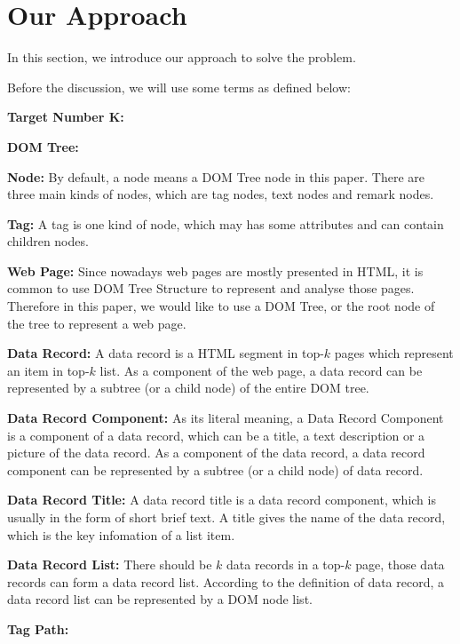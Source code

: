 \section{Our Approach}
\label{sec:algo}
In this section, we introduce our approach to solve the problem.

Before the discussion, we will use some terms as defined below:

{\bf Target Number K:}

{\bf DOM Tree:} 	

{\bf Node:}		
By default, a node means a DOM Tree node in this paper.
There are three main kinds of nodes, which are tag nodes, text nodes and remark nodes.

{\bf Tag:}		
A tag is one kind of node, which may has some attributes and can contain children nodes.

{\bf Web Page:}
Since nowadays web pages are mostly presented in HTML, it is common to use DOM Tree Structure to represent and analyse those pages.
Therefore in this paper, we would like to use a DOM Tree, or the root node of the tree to represent a web page.

{\bf Data Record:}
A data record is a HTML segment in top-$k$ pages which represent an item in top-$k$ list.
As a component of the web page, a data record can be represented by a subtree (or a child node) of the entire DOM tree.

{\bf Data Record Component:}
As its literal meaning,
a Data Record Component is a component of a data record, which can be a title, a text description or a picture of the data record.
As a component of the data record, a data record component can be represented by a subtree (or a child node) of data record.

{\bf Data Record Title:}
A data record title is a data record component, which is usually in the form of short brief text.
A title gives the name of the data record, which is the key infomation of a list item.

{\bf Data Record List:}
There should be $k$ data records in a top-$k$ page, those data records can form a data record list.
According to the definition of data record, a data record list can be represented by a DOM node list.

{\bf Tag Path:}

